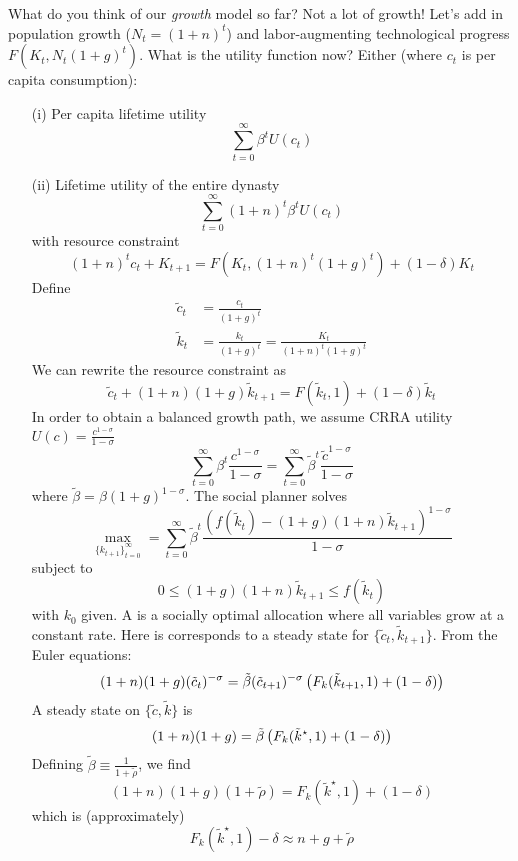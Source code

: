 \documentclass[10pt]{article}
\begin{document}
\begin{model}
	 What do you think of our \emph{growth} model so far? Not a lot of growth! Let's add in population growth ($N_t = (1+n)^t$) and labor-augmenting technological progress $F(K_t,N_t(1+g)^t)$. What is the utility function now? Either (where $c_t$ is per capita consumption):
	\begin{itemize}
		\item[(i)] Per capita lifetime utility
		\[
		\sum_{t=0}^\infty \beta^t U(c_t)
		\]
		\item[(ii)] Lifetime utility of the entire dynasty
		\[
		\sum_{t=0}^\infty (1 + n)^t \beta^t U(c_t)
		\]
		with resource constraint
		\[
		(1+n)^t c_t + K_{t+1} = F(K_t,(1+n)^t(1+g)^t) + (1-\delta)K_t
		\]
		Define
		\begin{align*}
			\tilde{c}_t &= \frac{c_t}{(1+g)^t} \\
			\tilde{k}_t &= \frac{k_t}{(1 + g)^t} = \frac{K_t}{(1+n)^t(1+g)^t}
		\end{align*}
		We can rewrite the resource constraint as
		\[
		\tilde{c}_t + (1 + n)(1 + g)\tilde{k}_{t+1} = F(\tilde{k}_t,1) + (1-\delta)\tilde{k}_t
		\]
		In order to obtain a balanced growth path, we assume CRRA utility $U(c) = \frac{c^{1-\sigma}}{1 - \sigma}$
		\[
		\sum_{t=0}^\infty \beta^t \frac{c^{1-\sigma}}{1 - \sigma} = \sum_{t=0}^\infty \tilde{\beta}^t \frac{\tilde{c}^{1-\sigma}}{1 - \sigma}
		\]
		where $\tilde{\beta} = \beta (1 + g)^{1 - \sigma}$. The social planner solves
		\[
		\max_{\{k_{t+1}\}_{t=0}^\infty} = \sum_{t=0}^\infty \tilde{\beta}^t \frac{(f(\tilde{k}_t) - (1+g)(1 + n)\tilde{k}_{t+1})^{1-\sigma}}{1-\sigma}
		\]
		subject to
		\[
		0 \le (1+g)(1+n)\tilde{k}_{t+1} \le f(\tilde{k}_t)
		\]
		with $k_0$ given. A  is a socially optimal allocation where all variables grow at a constant rate. Here is corresponds to a steady state for $\{\tilde{c}_t,\tilde{k}_{t+1}\}$. From the Euler equations:
		\[
		(1+n)(1+g) (\tilde{c}_t)^{-\sigma} = \tilde{\beta} (\tilde{c}_{t+1})^{-\sigma} \left( F_k(\tilde{k}_{t+1},1) + (1 - \delta) \right)
		\]
		A steady state on $\{\tilde{c},\tilde{k}\}$ is
		\[
		(1+n)(1+g) = \tilde{\beta} \left( F_k(\tilde{k}^\star,1) + (1-\delta) \right)
		\]
		Defining $\tilde{\beta} \equiv \frac{1}{1 + \tilde{\rho}}$, we find
		\[
		(1+n)(1+g)(1 + \tilde{\rho}) =F_k(\tilde{k}^\star,1) + (1-\delta) 
		\]
		which is (approximately)
		\[
		F_k(\tilde{k}^\star,1) - \delta \approx n + g + \tilde{\rho}
		\]
	\end{itemize}
\end{model}
\end{document}
